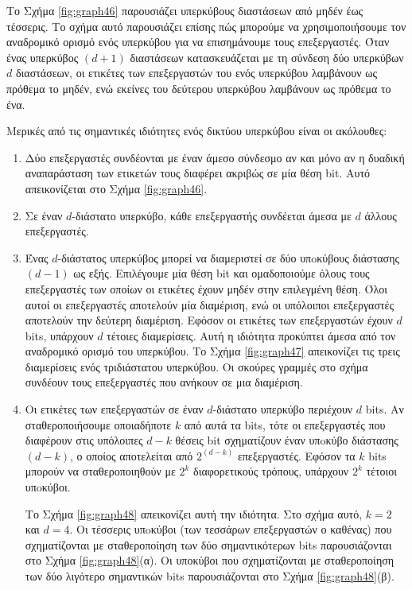 \documentclass[12pt,a4paper]{article} %
\begin{document}
Το Σχήμα \ref{fig:graph46} παρουσιάζει υπερκύβους διαστάσεων από μηδέν έως 
τέσσερις. Το σχήμα αυτό παρουσιάζει επίσης πώς μπορούμε να χρησιμοποιήσουμε 
τον αναδρομικό ορισμό ενός υπερκύβου για να επισημάνουμε τους επεξεργαστές. 
Όταν ένας υπερκύβος $(d + 1)$ διαστάσεων κατασκευάζεται με τη σύνδεση δύο 
υπερκύβων $d$ διαστάσεων, οι ετικέτες των επεξεργαστών του ενός υπερκύβου 
λαμβάνουν ως πρόθεμα το μηδέν, ενώ εκείνες του δεύτερου υπερκύβου λαμβάνουν 
ως πρόθεμα το ένα.

Μερικές από τις σημαντικές ιδιότητες ενός δικτύου υπερκύβου είναι οι 
ακόλουθες:

\begin{enumerate}
    \item Δύο επεξεργαστές συνδέονται με έναν άμεσο σύνδεσμο αν και μόνο 
    αν η δυαδική αναπαράσταση των ετικετών τους διαφέρει ακριβώς σε μία 
    θέση bit. Αυτό απεικονίζεται στο Σχήμα \ref{fig:graph46}.

    \item Σε έναν $d$-διάστατο υπερκύβο, κάθε επεξεργαστής συνδέεται άμεσα 
    με $d$ άλλους επεξεργαστές.

    \item Ένας $d$-διάστατος υπερκύβος μπορεί να διαμεριστεί σε δύο 
    υπoκύβους διάστασης $(d-1)$ ως εξής. Επιλέγουμε μία θέση 
    bit και ομαδοποιούμε όλους τους επεξεργαστές 
    των οποίων οι ετικέτες έχουν μηδέν στην επιλεγμένη θέση. Όλοι αυτοί 
    οι επεξεργαστές αποτελούν μία διαμέριση, ενώ οι υπόλοιποι επεξεργαστές 
    αποτελούν την δεύτερη διαμέριση. Εφόσον οι ετικέτες των επεξεργαστών 
    έχουν $d$ bits, υπάρχουν $d$ τέτοιες διαμερίσεις. 
    Αυτή η ιδιότητα προκύπτει άμεσα από τον αναδρομικό ορισμό του υπερκύβου. 
    Το Σχήμα \ref{fig:graph47} απεικονίζει τις τρεις διαμερίσεις ενός 
    τριδιάστατου υπερκύβου. Οι σκούρες γραμμές στο σχήμα συνδέουν 
    τους επεξεργαστές που ανήκουν σε μια διαμέριση.

    \item Οι ετικέτες των επεξεργαστών σε έναν $d$-διάστατο υπερκύβο περιέχουν 
    $d$ bits. Αν σταθεροποιήσουμε οποιαδήποτε 
    $k$ από αυτά τα bits, τότε οι επεξεργαστές 
    που διαφέρουν στις υπόλοιπες $d-k$ θέσεις bit 
    σχηματίζουν έναν υπoκύβο διάστασης $(d-k)$, ο οποίος αποτελείται από 
    $2^{(d-k)}$ επεξεργαστές. Εφόσον τα $k$ bits 
    μπορούν να σταθεροποιηθούν με $2^k$ διαφορετικούς τρόπους, υπάρχουν 
    $2^k$ τέτοιοι υπoκύβοι.

    Το Σχήμα \ref{fig:graph48} απεικονίζει αυτή την ιδιότητα. Στο σχήμα αυτό, 
    $k=2$ και $d=4$. Οι τέσσερις υπoκύβοι (των τεσσάρων επεξεργαστών ο καθένας) 
    που σχηματίζονται με σταθεροποίηση των δύο σημαντικότερων 
    bits παρουσιάζονται στο Σχήμα 
    \ref{fig:graph48}(α). Οι υποκύβοι που σχηματίζονται με σταθεροποίηση των 
    δύο λιγότερο σημαντικών bits παρουσιάζονται 
    στο Σχήμα \ref{fig:graph48}(β).


\end{enumerate}
\end{document}

